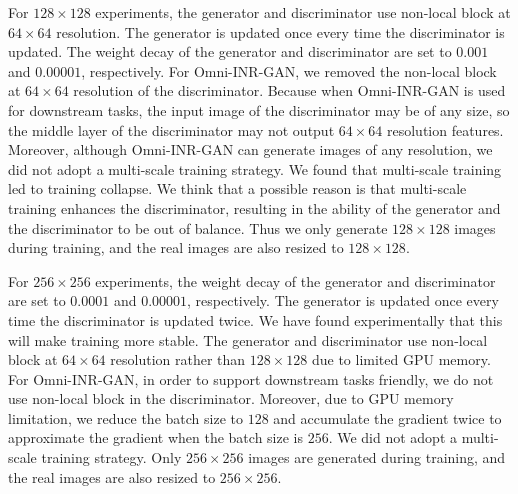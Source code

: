 \documentclass[paper_2425.tex]{subfiles}
\begin{document}
For $128\times128$ experiments, the generator and discriminator use non-local block at $64\times64$ resolution. The generator is updated once every time the discriminator is updated. The weight decay of the generator and discriminator are set to $0.001$ and $0.00001$, respectively. For Omni-INR-GAN, we removed the non-local block at $64\times64$ resolution of the discriminator. Because when Omni-INR-GAN is used for downstream tasks, the input image of the discriminator may be of any size, so the middle layer of the discriminator may not output $64\times64$ resolution features. Moreover, although Omni-INR-GAN can generate images of any resolution, we did not adopt a multi-scale training strategy. We found that multi-scale training led to training collapse. We think that a possible reason is that multi-scale training enhances the discriminator, resulting in the ability of the generator and the discriminator to be out of balance. Thus we only generate $128\times128$ images during training, and the real images are also resized to $128\times128$.

For $256\times256$ experiments, the weight decay of the generator and discriminator are set to $0.0001$ and $0.00001$, respectively. The generator is updated once every time the discriminator is updated twice. We have found experimentally that this will make training more stable. The generator and discriminator use non-local block at $64\times64$ resolution rather than $128\times128$ due to limited GPU memory. For Omni-INR-GAN, in order to support downstream tasks friendly, we do not use non-local block in the discriminator. Moreover, due to GPU memory limitation, we reduce the batch size to $128$ and accumulate the gradient twice to approximate the gradient when the batch size is $256$. We did not adopt a multi-scale training strategy. Only $256\times256$ images are generated during training, and the real images are also resized to $256\times256$.
\end{document}
